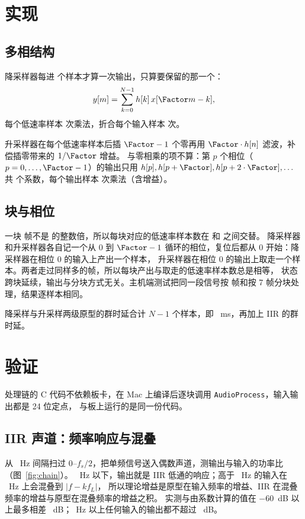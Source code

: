 \documentclass[zihao=-4, linespread=1.5, fontset=none]{ctexart}
\begin{document}
\section{实现}

\subsection{多相结构}

降采样器每进 \Factor{} 个样本才算一次输出，只算要保留的那一个：
\[ y[m]=\sum_{k=0}^{N-1}h[k]\,x[\Factor m-k], \]
每个低速率样本 \DecMuls{} 次乘法，折合每个输入样本 \DecMulsPerIn{} 次。

升采样器在每个低速率样本后插 $\Factor-1$ 个零再用 $\Factor\cdot h[n]$ 滤波，补偿插零带来的 $1/\Factor$ 增益。
与零相乘的项不算：第 $p$ 个相位（$p=0,\dots,\Factor-1$）的输出只用 $h[p],h[p+\Factor],h[p+2\cdot\Factor],\dots$
共 \BranchTaps{} 个系数，每个输出样本 \IntMuls{} 次乘法（含增益）。

\subsection{块与相位}

一块 \BlockFrames{} 帧不是 \Factor{} 的整数倍，所以每块对应的低速率样本数在 \LowPerBlockMin{} 和 \LowPerBlockMax{} 之间交替。
降采样器和升采样器各自记一个从 0 到 $\Factor-1$ 循环的相位，复位后都从 0 开始：降采样器在相位 0 的输入上产出一个样本，
升采样器在相位 0 的输出上取走一个样本。两者走过同样多的帧，所以每块产出与取走的低速率样本数总是相等，
状态跨块延续，输出与分块方式无关。主机端测试把同一段信号按 \BlockFrames{} 帧和按 7 帧分块处理，结果逐样本相同。

降采样与升采样两级原型的群时延合计 $N-1$ 个样本，即 \ChainDelayMs~ms，再加上 IIR 的群时延。

\section{验证}

处理链的 C 代码不依赖板卡，在 Mac 上编译后逐块调用 \texttt{AudioProcess}，输入输出都是 24 位定点，
与板上运行的是同一份代码。

\subsection{IIR 声道：频率响应与混叠}

从 \SweepStepHz~Hz 间隔扫过 $0$--$f_s/2$，把单频信号送入偶数声道，测输出与输入的功率比（图~\ref{fig:chain}）。
\StopHz~Hz 以下，输出就是 IIR 低通的响应；高于 \StopHz~Hz 的输入在 \LowRate~Hz 上会混叠到 $|f-kf_L|$，
所以理论增益是原型在输入频率的增益、IIR 在混叠频率的增益与原型在混叠频率的增益之积。
实测与由系数计算的值在 $-60$~dB 以上最多相差 \SweepMaxErrDb~dB；\StopHz~Hz 以上任何输入的输出都不超过 \AliasWorstDb~dB。
\end{document}
